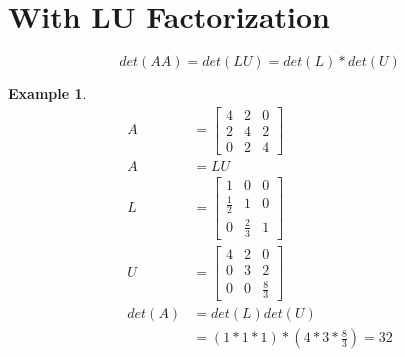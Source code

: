 \documentclass[12pt]{amsart}
\newtheorem{example}{Example}      %
\numberwithin{equation}{theorem}    %
\begin{document}
\section{With LU Factorization}

\begin{equation}
    det(AA) = det(LU) = det(L)*det(U)
\end{equation}

\begin{example}
    \begin{align*}
        A      & = \begin{bmatrix}
            4 & 2 & 0 \\
            2 & 4 & 2 \\
            0 & 2 & 4
        \end{bmatrix}       \\
        A      & = LU                               \\
        L      & = \begin{bmatrix}
            1           & 0           & 0 \\
            \frac{1}{2} & 1           & 0 \\
            0           & \frac{2}{3} & 1
        \end{bmatrix}       \\
        U      & = \begin{bmatrix}
            4 & 2 & 0           \\
            0 & 3 & 2           \\
            0 & 0 & \frac{8}{3}
        \end{bmatrix}       \\
        det(A) & = det(L)det(U)                     \\
               & = (1*1*1) * (4*3*\frac{8}{3}) = 32
    \end{align*}
\end{example}
\end{document}

